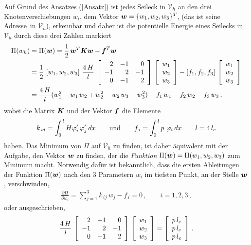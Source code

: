 Auf Grund des Ansatzes (\ref{Ansatz}) ist jedes Seileck in $\mathcal{V}_{h}$ an den drei Knotenverschiebungen $w_i$, dem Vektor $\vek w = \{w_1,w_2,w_3\}^T$, (das ist seine \glq Adresse\grq\ in $\mathcal{V}_h$), erkennbar und daher ist die potentielle Energie eines Seilecks in $ \mathcal{V}_h$ durch diese drei Zahlen markiert
\begin{align}
\Pi(w_h) &= \Pi(\vek w) = \frac{1}{2} \,\vek w^T \vek K \vek w - \vek f^T \vek w \nn \\
&= \frac{1}{2}\,\left[w_1,w_2,w_3\right]\,\frac{4\,H}{l}\,\left[\barr{r r r} 2 & - 1 & 0 \\ - 1 & 2 & -1 \\ 0 & -1 & 2 \earr\right]
\,\left[\barr{c} w_1 \\w_2 \\ w_3 \earr \right] - \left[ f_1, f_2, f_3\right]\,\left[\barr{c} w_1 \\ w_2 \\w_3\earr\right] \nn \\
&= \frac{4\,H}{l}(w_1^2 - w_1\,w_2 + w_2^2 - w_2\,w_3 + w_3^2) - f_1\,w_1 - f_2\,w_2 - f_3\,w_3\,,
\end{align}
wobei die Matrix $\vek K$ und der Vektor $\vek f$ die Elemente
\begin{align}
k_{\,ij} = \int_0^{\,l} H \Np_i' \, \Np_j' \, dx \qquad \mbox{und}\qquad f_{\,i} =
\int_0^{\,l} p \, \,\Np_i \, dx \qquad l = 4\,l_e
\end{align}
haben. Das Minimum von $\Pi$ auf $\mathcal{V}_{h}$ zu finden, ist daher \"{a}quivalent mit der Aufgabe,
den Vektor $\vek w$ zu finden, der die {\em Funktion} $\Pi(\vek w) = \Pi(w_1,w_2,w_3)$ zum Minimum macht.
Notwendig daf\"{u}r ist bekanntlich, dass die ersten Ableitungen der Funktion $\Pi(\vek w)$ nach den 3
Parametern $w_i$ im tiefsten Punkt, an der Stelle $\vek w$, verschwinden,
\begin{align}
\frac{\partial \Pi}{\partial w_i} = \sum_{j = 1}^3 k_{\,ij}\, w_j - f_{\,i} = 0\,,
\qquad i = 1,2,3\,,
\end{align}
oder ausgeschrieben,
\begin{align}\label{Eq5}
 \frac{4\,H}{l}\,\left[\barr{r r r} 2 & - 1 & 0 \\ - 1 & 2 & -1 \\ 0 & -1 & 2 \earr\right]
\,\left[\barr{c} w_1 \\w_2 \\ w_3 \earr \right] = \left[\barr{c} p\,l_e \\ p\,l_e  \\ p\,l_e  \earr \right]\,.
\end{align}

